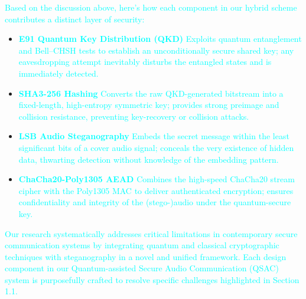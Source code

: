 \documentclass[a4paper]{cas-sc}
\begin{document}
\textcolor{cyan}{Based on the discussion above, here's how each component in our hybrid scheme contributes a distinct layer of security:}
\begin{itemize}
    \item \textbf{\textcolor{cyan}{E91 Quantum Key Distribution (QKD)}}
          \textcolor{cyan}{Exploits quantum entanglement and Bell–CHSH tests to establish an unconditionally secure shared key; any eavesdropping attempt inevitably disturbs the entangled states and is immediately detected.}

    \item \textbf{\textcolor{cyan}{SHA3-256 Hashing}}
          \textcolor{cyan}{Converts the raw QKD-generated bitstream into a fixed-length, high-entropy symmetric key; provides strong preimage and collision resistance, preventing key-recovery or collision attacks.}

    \item \textbf{\textcolor{cyan}{LSB Audio Steganography}}
          \textcolor{cyan}{Embeds the secret message within the least significant bits of a cover audio signal; conceals the very existence of hidden data, thwarting detection without knowledge of the embedding pattern.}

    \item \textbf{\textcolor{cyan}{ChaCha20-Poly1305 AEAD}}
          \textcolor{cyan}{Combines the high-speed ChaCha20 stream cipher with the Poly1305 MAC to deliver authenticated encryption; ensures confidentiality and integrity of the (stego-)audio under the quantum-secure key.}
\end{itemize}
\textcolor{cyan}{Our research systematically addresses critical limitations in contemporary secure communication systems by integrating quantum and classical cryptographic techniques with steganography in a novel and unified framework. Each design component in our Quantum-assisted Secure Audio Communication (QSAC) system is purposefully crafted to resolve specific challenges highlighted in Section 1.1.}
\end{document}
